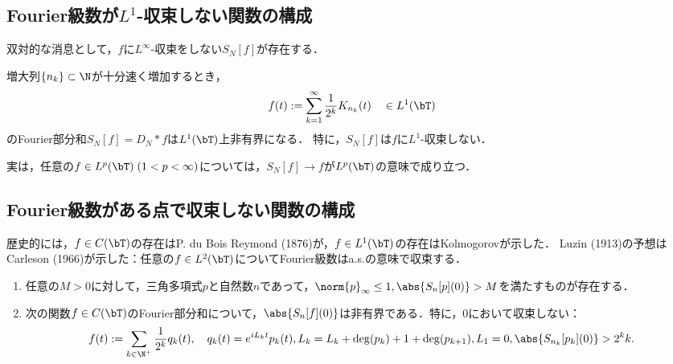 \documentclass[uplatex,dvipdfmx]{jsreport}
\begin{document}
\subsection{Fourier級数が$L^1$-収束しない関数の構成}

\begin{tcolorbox}[colframe=ForestGreen, colback=ForestGreen!10!white,breakable,colbacktitle=ForestGreen!40!white,coltitle=black,fonttitle=\bfseries\sffamily,
title=Fejer核の級数として構成する]
    双対的な消息として，$f$に$L^\infty$-収束をしない$S_N[f]$が存在する．
\end{tcolorbox}

\begin{theorem}\label{thm-function-with-L1-diverging-Fourier-series}
    増大列$\{n_k\}\subset\N$が十分速く増加するとき，
    \[f(t):=\sum_{k=1}^\infty\frac{1}{2^k}K_{n_k}(t)\quad\in L^1(\bT)\]
    のFourier部分和$S_N[f]=D_N*f$は$L^1(\bT)$上非有界になる．
    特に，$S_N[f]$は$f$に$L^1$-収束しない．
\end{theorem}

\begin{remarks}[Riesz]
    実は，任意の$f\in L^p(\bT)\;(1<p<\infty)$については，$S_N[f]\to f$が$L^p(\bT)$の意味で成り立つ．
\end{remarks}

\subsection{Fourier級数がある点で収束しない関数の構成}

\begin{tcolorbox}[colframe=ForestGreen, colback=ForestGreen!10!white,breakable,colbacktitle=ForestGreen!40!white,coltitle=black,fonttitle=\bfseries\sffamily,
title=]
    歴史的には，$f\in C(\bT)$の存在はP. du Bois Reymond (1876)が，$f\in L^1(\bT)$の存在はKolmogorovが示した．
    Luzin (1913)の予想はCarleson (1966)が示した：任意の$f\in L^2(\bT)$についてFourier級数はa.s.の意味で収束する．
\end{tcolorbox}

\begin{theorem}\mbox{}\label{thm-du-Bois-Reymond}
    \begin{enumerate}
        \item 任意の$M>0$に対して，三角多項式$p$と自然数$n$であって，$\norm{p}_\infty\le 1,\abs{S_n[p](0)}>M$を満たすものが存在する．
        \item 次の関数$f\in C(\bT)$のFourier部分和について，$\abs{S_n[f](0)}$は非有界である．特に，$0$において収束しない：
        \[f(t):=\sum_{k\in\N^+}\frac{1}{2^k}q_k(t),\quad q_k(t)=e^{iL_kt}p_k(t),L_k=L_k+\deg(p_k)+1+\deg({p_{k+1}}),L_1=0,\abs{S_{n_k}[p_k](0)}>2^{k}k.\]
    \end{enumerate}
\end{theorem}
\end{document}
